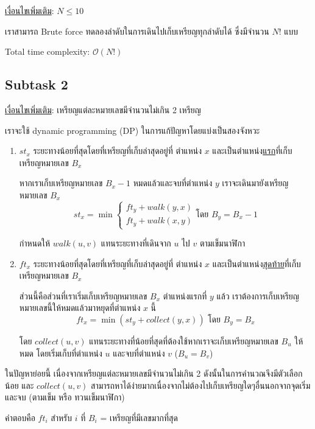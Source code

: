 \documentclass[12pt]{article}
\begin{document}
\underline{เงื่อนไขเพิ่มเติม}: $N \leq 10$

เราสามารถ Brute force ทดลองลำดับในการเดินไปเก็บเหรียญทุกลำดับได้ ​ซึ่งมีจำนวน $N!$ แบบ

Total time complexity: $\mathcal{O}(N!)$

\subsection{Subtask 2}

\underline{เงื่อนไขเพิ่มเติม}: เหรียญแต่ละหมายเลขมีจำนวนไม่เกิน 2 เหรียญ

เราจะใช้ dynamic programming (DP) ในการแก้ปัญหาโดยแบ่งเป็นสองจังหวะ

\begin{enumerate}[leftmargin=*]
  \item $st_x$ ระยะทางน้อยที่สุดโดยที่เหรียญที่เก็บล่าสุดอยู่ที่ ตำแหน่ง $x$ และเป็นตำแหน่ง\underline{แรก}ที่เก็บเหรียญหมายเลข $B_x$

  หากเราเก็บเหรียญหมายเลข $B_x - 1$ หมดแล้วและจบที่ตำแหน่ง $y$ เราจะเดินมายังเหรียญหมายเลข $B_x$
  $$
  st_x = \min
  \begin{cases}
    ft_y + walk(y, x) \\
    ft_y + walk(x, y)
  \end{cases}
  \text{โดย   } B_y = B_x - 1
  $$

  กำหนดให้ $walk(u,v)$ แทนระยะทางที่เดินจาก $u$ ไป $v$ ตามเข็มนาฬิกา
  \item $ft_x$ ระยะทางน้อยที่สุดโดยที่เหรียญที่เก็บล่าสุดอยู่ที่ ตำแหน่ง $x$ และเป็นตำแหน่ง\underline{สุดท้าย}ที่เก็บเหรียญหมายเลข $B_x$
  
  ส่วนนี้คือส่วนที่เราเริ่มเก็บเหรียญหมายเลข $B_x$ ตำแหน่งแรกที่ $y$ แล้ว เราต้องการเก็บเหรียญหมายเลขนี้ให้หมดแล้วมาหยุดที่ตำแหน่ง $x$ นี้
  $$
  ft_x = \min(st_y + collect(y,x)) \text{  โดย  } B_y = B_x
  $$

  โดย $collect(u,v)$ แทนระยะทางที่น้อยที่สุดที่ต้องใช้หากเราจะเก็บเหรียญหมายเลข $B_u$ ให้หมด โดยเริ่มเก็บที่ตำแหน่ง $u$ และจบที่ตำแหน่ง $v$ ($B_u = B_v$)
\end{enumerate}

ในปัญหาย่อยนี้ เนื่องจากเหรียญแต่ละหมายเลขมีจำนวนไม่เกิน 2 ดังนั้นในการคำนวณจึงมีตัวเลือกน้อย และ $collect(u,v)$ สามารถหาได้ง่ายมากเนื่องจากไม่ต้องไปเก็บเหรียญใดๆอื่นนอกจากจุดเริ่มและจบ (ตามเข็ม หรือ ทวนเข็มนาฬิกา)

คำตอบคือ $ft_i$ สำหรับ $i$ ที่ $B_i$ = เหรียญที่มีเลขมากที่สุด
\end{document}
